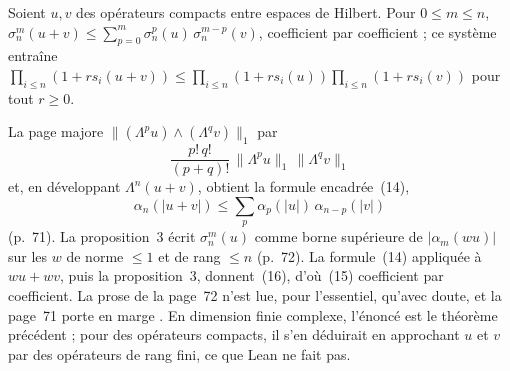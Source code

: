 \begin{enonce}\nonverifie
Soient $u, v$ des opérateurs compacts entre espaces de Hilbert. Pour $0 \leq m \leq n$, $\sigma_n^m(u+v) \leq \sum_{p=0}^{m} \sigma_n^p(u)\,\sigma_n^{m-p}(v)$, coefficient par coefficient ; ce système entraîne $\prod_{i \leq n}(1 + r s_i(u+v)) \leq \prod_{i \leq n}(1 + r s_i(u)) \prod_{i \leq n}(1 + r s_i(v))$ pour tout $r \geq 0$.
\end{enonce}
\begin{demopage}[pages 71 et 72]
La page majore $\|(\Lambda^p u) \wedge (\Lambda^q v)\|_1$ par
\[
  \frac{p!\,q!}{(p+q)!}\,\|\Lambda^p u\|_1\,\|\Lambda^q v\|_1
\]
et, en développant $\Lambda^n(u+v)$, obtient la formule encadrée~(14),
\[
  \alpha_n(|u+v|) \leq \sum_p \alpha_p(|u|)\,\alpha_{n-p}(|v|)
\]
(p.~71). La proposition~3 écrit $\sigma_n^m(u)$ comme borne supérieure de $|\alpha_m(wu)|$ sur les $w$ de norme $\leq 1$ et de rang $\leq n$ (p.~72). La formule~(14) appliquée à $wu + wv$, puis la proposition~3, donnent~(16), d'où~(15) coefficient par coefficient. La prose de la page~72 n'est lue, pour l'essentiel, qu'avec doute, et la page~71 porte en marge . En dimension finie complexe, l'énoncé est le théorème précédent ; pour des opérateurs compacts, il s'en déduirait en approchant $u$ et $v$ par des opérateurs de rang fini, ce que Lean ne fait pas.
\end{demopage}
